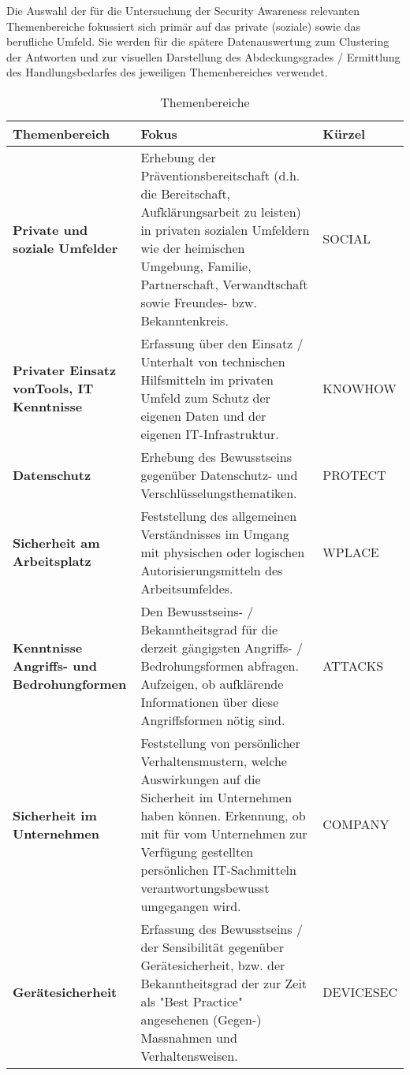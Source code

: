 \documentclass[../../main.tex]{subfiles}
\begin{document}
\begin{sloppypar}
Die Auswahl der für die Untersuchung der Security Awareness relevanten Themenbereiche fokussiert sich primär auf das private (soziale) sowie das berufliche Umfeld. Sie werden für die spätere Datenauswertung zum Clustering der Antworten und zur visuellen Darstellung des Abdeckungsgrades / Ermittlung des Handlungsbedarfes des jeweiligen Themenbereiches verwendet.
\end{sloppypar}



\sloppy 

\begin{table}[H]
\tablefontsize	
\centering
\caption{Themenbereiche}
\label{themenbereiche}

\begin{tabular}{ |p{4cm}|p{9.5cm}|p{2.0cm}|}

\hline
\tableheaderbgcolor
\textbf{Themenbereich} & \textbf{Fokus} & \textbf{Kürzel}\\ 
\hline
\textbf{Private und \newline soziale Umfelder} & Erhebung der Präventionsbereitschaft (d.h. die Bereitschaft, Aufklärungsarbeit zu leisten) in privaten sozialen Umfeldern wie der heimischen Umgebung, Familie, Partnerschaft, Verwandtschaft sowie Freundes- bzw. Bekanntenkreis. & SOCIAL\\
\hline
\textbf{Privater Einsatz von\newline Tools, IT Kenntnisse} & Erfassung über den Einsatz / Unterhalt von technischen Hilfsmitteln im privaten Umfeld zum Schutz der eigenen Daten und der eigenen IT-Infrastruktur. & KNOWHOW\\
\hline
\textbf{Datenschutz} & Erhebung des Bewusstseins gegenüber Datenschutz- und Verschlüsselungsthematiken. & PROTECT\\
\hline
\textbf{Sicherheit am \newline Arbeitsplatz} & Feststellung des allgemeinen Verständnisses im Umgang mit physischen oder logischen Autorisierungsmitteln des Arbeitsumfeldes. & WPLACE\\
\hline
\textbf{Kenntnisse Angriffs- \newline und Bedrohungformen} & Den Bewusstseins- / Bekanntheitsgrad für die derzeit gängigsten Angriffs- / Bedrohungsformen abfragen. Aufzeigen, ob aufklärende Informationen über diese Angriffsformen nötig sind. & ATTACKS\\
\hline
\textbf{Sicherheit im \newline Unternehmen} & Feststellung von persönlicher Verhaltensmustern, welche Auswirkungen auf die Sicherheit im Unternehmen haben können. Erkennung, ob mit für vom Unternehmen zur Verfügung gestellten persönlichen IT-Sachmitteln verantwortungsbewusst umgegangen wird. & COMPANY\\
\hline
\textbf{Gerätesicherheit} & Erfassung des Bewusstseins / der Sensibilität gegenüber Gerätesicherheit, bzw. der Bekanntheitsgrad der zur Zeit als "Best Practice" angesehenen (Gegen-) Massnahmen und Verhaltensweisen. & DEVICESEC\\
\hline

\end{tabular}
\end{table}
\end{document}
